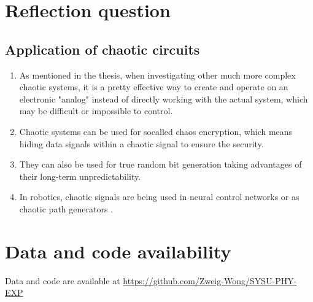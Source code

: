 \documentclass[12pt,a4paper,UTF8]{article}
\begin{document}


\section{Reflection question}
    \subsection{Application of chaotic circuits}
    \begin{enumerate}[label=\arabic*.]
        \item As mentioned in the thesis, when investigating other much more complex chaotic systems, it is a pretty effective way to create and operate on an electronic "analog" instead of directly working with the actual system, which may be difficult or impossible to control.
        \item Chaotic systems can be used for socalled chaos encryption, which means hiding data signals within a chaotic signal to ensure the security\autocite{tanougastHardwareImplementationChaos2011}. 
        \item They can also be used for true random bit generation taking advantages of their long-term unpredictability\autocite{nguimdoFastRandomBits2012a}. 
        \item In robotics, chaotic signals are being used in neural control networks or as chaotic path generators \autocite{steingrubeSelforganizedAdaptationSimple2010}.
    \end{enumerate}

\section{Data and code availability}
Data and code are available at \url{https://github.com/Zweig-Wong/SYSU-PHY-EXP}
\printbibliography[title=Reference] 
\end{document}
